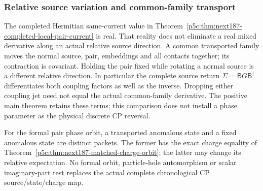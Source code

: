 \documentclass[11pt,a4paper]{article}
\begin{document}
\subsubsection{Relative source variation and common-family transport}
\label{p5c:v2189:app:relativecharge}
The completed Hermitian same-current value in
Theorem~\ref{p5c:thm:next187-completed-local-pair-current} is real. That
reality does not eliminate a real mixed derivative along an actual relative
source direction. A common transported family moves the normal source,
pair, embeddings and all contacts together; its contraction is covariant.
Holding the pair fixed while rotating a normal source is a different
relative direction. In particular the complete source return
\(\Sigma=\mathsf B G\mathsf B^\dagger\) differentiates both coupling
factors as well as the inverse. Dropping either coupling jet need not equal
the actual common-family derivative. The positive main theorem retains
these terms; this comparison does not install a phase parameter as the
physical discrete CP reversal.

For the formal pair phase orbit, a transported anomalous state and a
fixed anomalous state are distinct packets. The former has the exact
charge equality of
Theorem~\ref{p5c:thm:next187-matched-charge-orbit}; the latter may change
its relative expectation. No formal orbit, particle-hole automorphism or
scalar imaginary-part test replaces the actual complete chronological
CP source/state/charge map.




\end{document}
